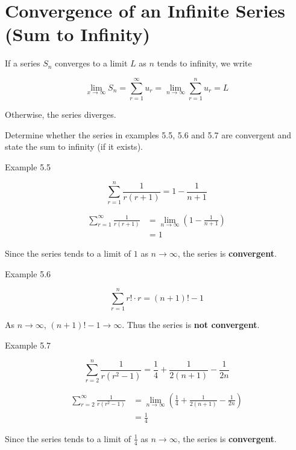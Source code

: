 \documentclass[11pt,a4paper]{book}
\begin{document}
\section{Convergence of an Infinite Series (Sum to Infinity)}

\begin{tcolorbox}[colback=blue!5, colframe=black,boxrule=.4pt, sharpish corners]

If a series $S_{n}$ converges to a limit $L$ as $n$ tends to infinity,
we write

\[
\lim_{x\to\infty}S_{n}=\sum_{r=1}^{\infty}u_{r}=\lim_{n\to\infty}\sum_{r=1}^{n}u_{r}=L
\]

Otherwise, the series diverges.
\end{tcolorbox}

\begin{example}

Determine whether the series in examples \textsf{5.5}, \textsf{5.6} and \textsf{5.7} are convergent and state the sum to infinity (if it exists).

\Solution

\textsf{Example 5.5}

\[
\sum_{r=1}^{n}\frac{1}{r\left(r+1\right)}=1-\frac{1}{n+1}
\]

\begin{align*}
\sum_{r=1}^{\infty}\frac{1}{r\left(r+1\right)} & =\lim_{n\to\infty}\left(1-\frac{1}{n+1}\right)\\
 & =1
\end{align*}

Since the series tends to a limit of $1$ as $n\to\infty$, the series
is \textbf{convergent}.

\bigskip

\textsf{Example 5.6}

\[
\sum_{r=1}^{n}r!\cdot r=\left(n+1\right)!-1
\]

As $n\to\infty$, $\left(n+1\right)!-1\to\infty$. Thus the series
is \textbf{not convergent}.

\bigskip

\textsf{Example 5.7}

\[
\sum_{r=2}^{n}\frac{1}{r\left(r^{2}-1\right)}=\frac{1}{4}+\frac{1}{2\left(n+1\right)}-\frac{1}{2n}
\]

\begin{align*}
{\displaystyle \sum_{r=2}^{\infty}\frac{1}{r\left(r^{2}-1\right)}} & =\lim_{n\to\infty}\left(\frac{1}{4}+\frac{1}{2\left(n+1\right)}-\frac{1}{2n}\right)\\
 & =\frac{1}{4}
\end{align*}

Since the series tends to a limit of ${\displaystyle \frac{1}{4}}$
as $n\to\infty$, the series is \textbf{convergent}.

\end{example}

\end{document}
